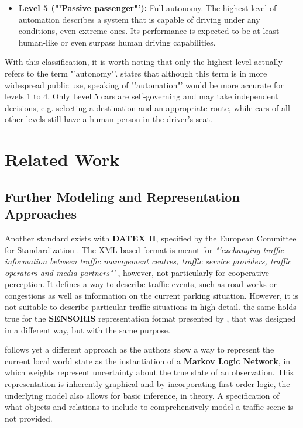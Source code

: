 \begin{itemize}
	\item \textbf{Level 5 ("'Passive passenger"'):} Full autonomy. The highest level of automation describes a system that is capable of driving under any conditions, even extreme ones. Its performance is expected to be at least human-like or even surpass human driving capabilities. 
\end{itemize}

With this classification, it is worth noting that only the highest level actually refers to the term "'autonomy"'. \cite{wood2012potential} states that although this term is in more widespread public use, speaking of "'automation"' would be more accurate for levels 1 to 4. Only Level 5 cars are self-governing and may take independent decisions, e.g. selecting a destination and an appropriate route, while cars of all other levels still have a human person in the driver's seat.

\section{Related Work}
\label{sec:appendix:texts:related_work}

\subsection{Further Modeling and Representation Approaches}
\label{subsec:appendix:texts:related_work:state_represtation}
Another standard exists with \textbf{DATEX II}, specified by the European Committee for Standardization \cite{Dolger2011}. The XML-based format is meant for \textit{"'exchanging traffic information between traffic management centres, traffic service providers, traffic operators and media partners"'} \cite{wiki:datex2}, however, not particularly for cooperative perception. It defines a way to describe traffic events, such as road works or congestions as well as information on the current parking situation. However, it is not suitable to describe particular traffic situations in high detail. the same holds true for the \textbf{SENSORIS} representation format presented by \cite{Hohm2019}, that was designed in a different way, but with the same purpose.
\par
\medskip

\cite{Stiller2012} follows yet a different approach as the authors show a way to represent the current local world state as the instantiation of a \textbf{Markov Logic Network}, in which weights represent uncertainty about the true state of an observation. This representation is inherently graphical and by incorporating first-order logic, the underlying model also allows for basic inference, in theory. A specification of what objects and relations to include to comprehensively model a traffic scene is not provided.


